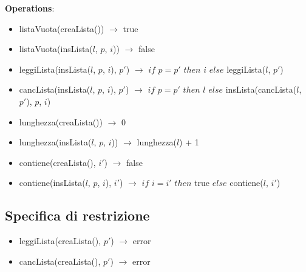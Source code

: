 \documentclass[italian,12pt,a4paper]{article}
\begin{document}
	\textbf{Operations}:
	
	\begin{itemize}
		\item listaVuota(creaLista()) $\rightarrow$ true
		\item listaVuota(insLista($l$, $p$, $i$)) $\rightarrow$ false
		
		\item leggiLista(insLista($l$, $p$, $i$), $p'$) $\rightarrow$ $if$ $p=p'$ $then$ $i$ $else$ leggiLista($l$, $p'$)
		
		\item cancLista(insLista($l$, $p$, $i$), $p'$) $\rightarrow$ $if$ $p=p'$ $then$ $l$ $else$ insLista(cancLista($l$, $p'$), $p$, $i$)
		
		\item lunghezza(creaLista()) $\rightarrow$ 0
		\item lunghezza(insLista($l$, $p$, $i$)) $\rightarrow$ lunghezza($l$) + 1
		
		\item contiene(creaLista(), $i'$) $\rightarrow$ false
		\item contiene(insLista($l$, $p$, $i$), $i'$) $\rightarrow$ $if$ $i=i'$ $then$ true $else$ contiene($l$, $i'$)
	\end{itemize}
	
	\subsection{Specifica di restrizione}
	
	\begin{itemize}
		\item leggiLista(creaLista(), $p'$) $\rightarrow$ error
		\item cancLista(creaLista(), $p'$) $\rightarrow$ error
	\end{itemize}
	
\end{document}
